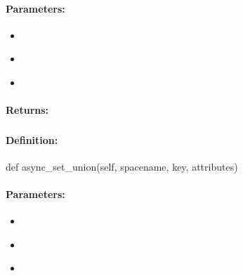 \paragraph{Parameters:}
\begin{itemize}[noitemsep]
\item {}\\

\item {}\\

\item {}\\

\end{itemize}

\paragraph{Returns:}


\pagebreak
\subsubsection{}
\label{api:python:async_set_union}


\paragraph{Definition:}
\begin{pythoncode}
def async_set_union(self, spacename, key, attributes)
\end{pythoncode}

\paragraph{Parameters:}
\begin{itemize}[noitemsep]
\item {}\\

\item {}\\

\item {}\\

\end{itemize}

